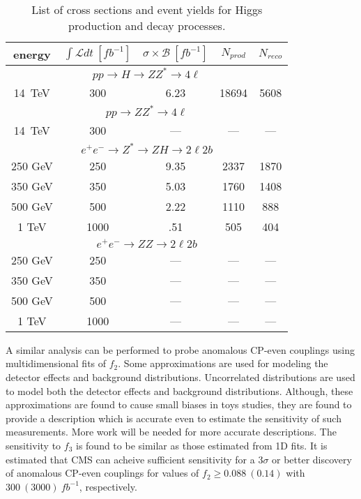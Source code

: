 \begin{table}
\begin{center}
\begin{tabular}{ccccc}
\hline 
\hline
energy & $\int \mathscr{L}dt~[fb^{-1}]$ & 
$\sigma\times\mathscr{B}~[fb^{-1}]$ & $N_{prod}$ & $N_{reco}$ \\ 
\hline
\hline
\multicolumn{5}{c}{$pp\to H \to ZZ^* \to 4\ell$}  \\
\hline
14~TeV & 300  &  6.23 & 18694 & 5608 \\
\hline
\multicolumn{5}{c}{$pp\to ZZ^* \to 4\ell$}  \\
\hline
14~TeV & 300 &  --- & --- & --- \\
\hline
\multicolumn{5}{c}{$e^+e^-\to Z^* \to ZH \to 2\ell 2b$} \\
\hline
250 GeV & 250 & 9.35 & 2337 & 1870 \\
350 GeV & 350 & 5.03 & 1760 & 1408 \\
500 GeV & 500 & 2.22 & 1110 & 888 \\
1 TeV& 1000& .51  & 505  & 404 \\
\hline
\multicolumn{5}{c}{$e^+e^-\to ZZ \to 2\ell 2b$} \\
\hline
250 GeV & 250 & --- & --- & --- \\
350 GeV & 350 & --- & --- & --- \\
500 GeV & 500 & --- & --- & --- \\
1 TeV   & 1000& --- & --- & --- \\
\hline
\hline
\end{tabular}
\end{center}
\label{table:FutureMeasEventYields}
\caption{List of cross sections and event yields for Higgs
production and decay processes.}
\end{table}

A similar analysis can be performed  to probe anomalous CP-even 
couplings using multidimensional fits of $f_{2}$.  Some 
approximations are used for modeling the detector
effects and background distributions.  Uncorrelated distributions
are used to model both the detector effects and background 
distributions.  Although, these approximations are found to cause 
small biases in toys studies, they are found to provide 
a description which is accurate even to estimate the
sensitivity of such measurements.   More work will be needed
for more accurate descriptions.  The sensitivity to $f_{3}$ 
is found to be similar as those estimated from 1D fits.  
It is estimated that CMS can acheive sufficient sensitivity 
for a $3\sigma$ or better discovery of anomalous CP-even 
couplings for values of $f_{2}\geq0.088~(0.14)$ with 
$300~(3000)~fb^{-1}$, respectively.

